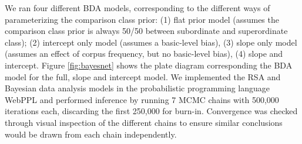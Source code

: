 \documentclass[doc]{apa6}
\begin{document}
We ran four different BDA models, corresponding to the different ways of parameterizing the comparison class prior: (1) flat prior model (assumes the comparison class prior is always 50/50 between subordinate and superordinate class); (2) intercept only model (assumes a basic-level bias), (3) slope only model (assumes an effect of corpus frequency, but no basic-level bias), (4) slope and intercept.
Figure \ref{fig:bayesnet} shows the plate diagram corresponding the BDA model for the full, slope and intercept model. 
We implemented the RSA and Bayesian data analysis models in the probabilistic programming language WebPPL \cite{dippl} and performed inference by running 7 MCMC chains with 500,000 iterations each, discarding the first 250,000 for burn-in. 
Convergence was checked through visual inspection of the different chains to ensure similar conclusions would be drawn from each chain independently. 





\end{document}
